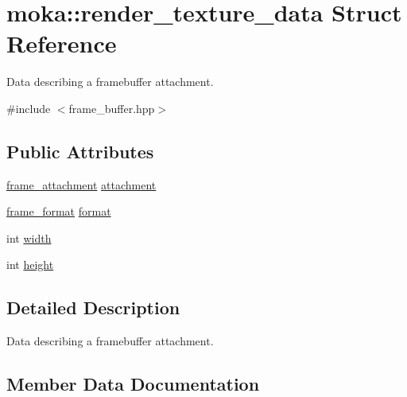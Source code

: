 \hypertarget{structmoka_1_1render__texture__data}{}\section{moka\+::render\+\_\+texture\+\_\+data Struct Reference}
\label{structmoka_1_1render__texture__data}


Data describing a framebuffer attachment.  




{\ttfamily \#include $<$frame\+\_\+buffer.\+hpp$>$}

\subsection*{Public Attributes}
\begin{DoxyCompactItemize}
\item 
\mbox{\hyperlink{namespacemoka_a0a44ecbb877dec1107d9915dc95c58d1}{frame\+\_\+attachment}} \mbox{\hyperlink{structmoka_1_1render__texture__data_ab45ff3dcdae44d8cee67c49edc6ca547}{attachment}}
\item 
\mbox{\hyperlink{namespacemoka_a2ce6b5e22cd8e423713ef76033a279de}{frame\+\_\+format}} \mbox{\hyperlink{structmoka_1_1render__texture__data_ae56a3f19593dad95cbfa1c221c5fdbfd}{format}}
\item 
int \mbox{\hyperlink{structmoka_1_1render__texture__data_af62ca60f7ffc4314c16e948d3ce5cede}{width}}
\item 
int \mbox{\hyperlink{structmoka_1_1render__texture__data_ad90dbd689d2120a67bb911ba0f845594}{height}}
\end{DoxyCompactItemize}


\subsection{Detailed Description}
Data describing a framebuffer attachment. 

\subsection{Member Data Documentation}
\mbox{\label{structmoka_1_1render__texture__data_ab45ff3dcdae44d8cee67c49edc6ca547}} 
